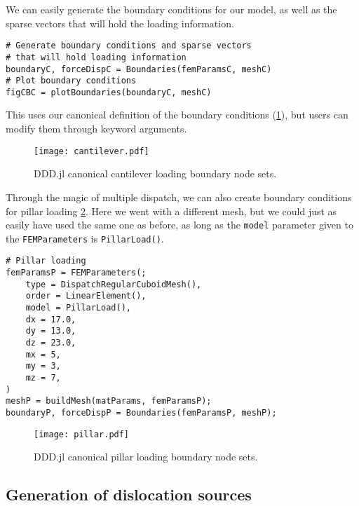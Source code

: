 We can easily generate the boundary conditions for our model, as well as the sparse vectors that will hold the loading information.
\begin{verbatim}
# Generate boundary conditions and sparse vectors 
# that will hold loading information
boundaryC, forceDispC = Boundaries(femParamsC, meshC)
# Plot boundary conditions
figCBC = plotBoundaries(boundaryC, meshC)
\end{verbatim}
This uses our canonical definition of the boundary conditions (\cref{f:cantileverNodeSet}), but users can modify them through keyword arguments.
\begin{figure}
    \centering
    \texttt{[image: cantilever.pdf]}
    \caption{DDD.jl canonical cantilever loading boundary node sets.}
    \label{f:cantileverNodeSet}
\end{figure}
Through the magic of multiple dispatch, we can also create boundary conditions for pillar loading \cref{f:pillarLoad}. Here we went with a different mesh, but we could just as easily have used the same one as before, as long as the \texttt{model} parameter given to the \texttt{FEMParameters} is \texttt{PillarLoad()}.
\begin{verbatim}
# Pillar loading
femParamsP = FEMParameters(;
    type = DispatchRegularCuboidMesh(),
    order = LinearElement(),
    model = PillarLoad(),
    dx = 17.0,
    dy = 13.0,
    dz = 23.0,
    mx = 5,
    my = 3,
    mz = 7,
)
meshP = buildMesh(matParams, femParamsP);
boundaryP, forceDispP = Boundaries(femParamsP, meshP);
\end{verbatim}
\begin{figure}
    \centering
    \texttt{[image: pillar.pdf]}
    \caption{DDD.jl canonical pillar loading boundary node sets.}
    \label{f:pillarLoad}
\end{figure}

\subsection{Generation of dislocation sources}

